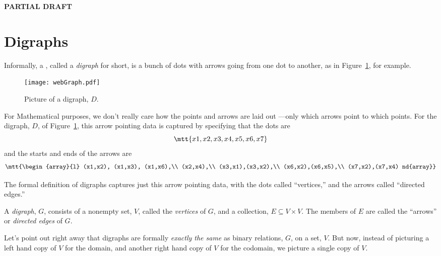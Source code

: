 
\textbf{PARTIAL DRAFT}

\section{Digraphs} 

Informally, a , called a \emph{digraph} for short, is
a bunch of dots with arrows going from one dot to another, as in
Figure~\ref{picdigraphg}, for example.

\begin{figure}[htbp]
\texttt{[image: webGraph.pdf]}
\caption{Picture of a digraph, $D$.}
\label{picdigraphg}
\end{figure}



For Mathematical purposes, we don't really care how the points and arrows
are laid out ---only which arrows point to which points.  For the digraph,
$D$, of Figure~\ref{picdigraphg}, this arrow pointing data is captured by
specifying that the dots are
\[
\mtt{x1,x2,x3,x4,x5,x6,x7}
\]
and the starts and ends of the arrows are
\[\mtt{\begin{array}{l}
(x1,x2), (x1,x3), (x1,x6),\\
(x2,x4),\\
(x3,x1),(x3,x2),\\
(x6,x2),(x6,x5),\\
(x7,x2),(x7,x4)
nd{array}}\]

The formal definition of digraphs captures just this arrow pointing data,
with the dots called ``vertices,'' and the arrows called ``directed edges.''

\begin{definition}\label{graphdef} 
  A \emph{digraph}, $G$, consists of a nonempty set, $V$, called the
  \emph{vertices} of $G$, and a collection, $E \subseteq V \times V$.  The
  members of $E$ are called the ``arrows'' or \emph{directed edges} of
  $G$.
\end{definition}

Let's point out right away that digraphs are formally \emph{exactly the
  same} as binary relations, $G$, on a set, $V$.  But now, instead of
picturing a left hand copy of $V$ for the domain, and another right hand
copy of $V$ for the codomain, we picture a single copy of $V$.

